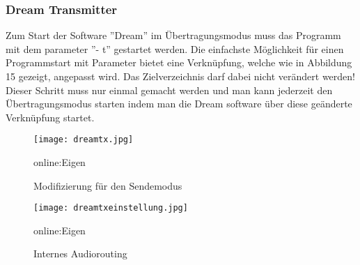 \subsubsection{Dream Transmitter}
\label{subsubsec:dreamtx}
Zum Start der Software ”Dream” im Übertragungsmodus muss das Programm mit dem parameter ”- t” gestartet werden. Die einfachste Möglichkeit für einen Programmstart mit Parameter bietet eine Verknüpfung, welche wie in Abbildung 15 gezeigt, angepasst wird. Das Zielverzeichnis darf dabei nicht verändert werden! Dieser Schritt muss nur einmal gemacht werden und man kann jederzeit den Übertragungsmodus starten indem man die Dream software über diese geänderte Verknüpfung startet.

\begin{figure}[H]
	\centering
	\texttt{[image: dreamtx.jpg]}
	\caption[Modifizierung für den Sendemodus]{Modifizierung für den Sendemodus} \gls{online:Eigen}
	\label{fig:dreamtx}
\end{figure}

\begin{figure}[H]
	\centering
	\texttt{[image: dreamtxeinstellung.jpg]}
	\caption[Internes Audiorouting]{Internes Audiorouting} \gls{online:Eigen}
	\label{fig:dreamtxeinstellung}
\end{figure}

